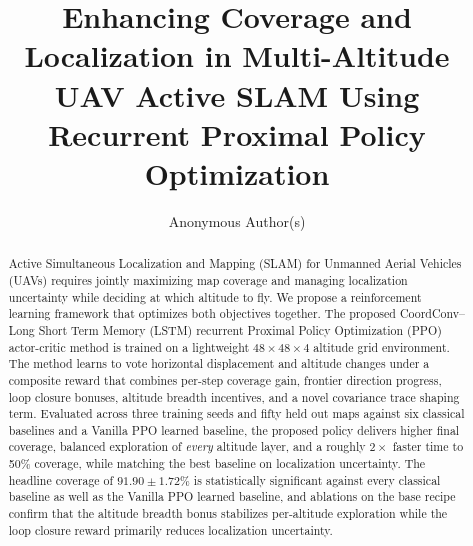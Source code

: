 \documentclass[runningheads]{llncs}
\begin{document}
\title{Enhancing Coverage and Localization in Multi-Altitude UAV Active SLAM Using Recurrent Proximal Policy Optimization}


\author{Anonymous Author(s)}


\maketitle

\begin{abstract}
Active Simultaneous Localization and Mapping (SLAM) for Unmanned Aerial Vehicles (UAVs) requires jointly maximizing map coverage and managing localization uncertainty while deciding at which altitude to fly. We propose a reinforcement learning framework that optimizes both objectives together. The proposed CoordConv--Long Short Term Memory (LSTM) recurrent Proximal Policy Optimization (PPO) actor-critic method is trained on a lightweight $48{\times}48{\times}4$ altitude grid environment. The method learns to vote horizontal displacement and altitude changes under a composite reward that combines per-step coverage gain, frontier direction progress, loop closure bonuses, altitude breadth incentives, and a novel covariance trace shaping term. Evaluated across three training seeds and fifty held out maps against six classical baselines and a Vanilla PPO learned baseline, the proposed policy delivers higher final coverage, balanced exploration of \emph{every} altitude layer, and a roughly $2{\times}$ faster time to 50\% coverage, while matching the best baseline on localization uncertainty. The headline coverage of $\mathbf{91.90 \pm 1.72\%}$ is statistically significant against every classical baseline as well as the Vanilla PPO learned baseline, and ablations on the base recipe confirm that the altitude breadth bonus stabilizes per-altitude exploration while the loop closure reward primarily reduces localization uncertainty.
\end{abstract}
\end{document}

